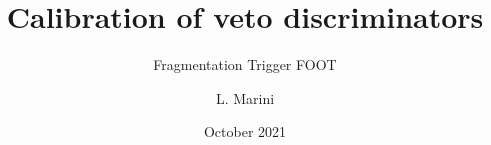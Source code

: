 \title[Calibration of veto discriminators]{Calibration of veto discriminators}
\subtitle[]{Fragmentation Trigger FOOT}
\author[L. Marini, INFN Pisa ]{L. Marini} 
\date[October 2021]{October 2021}

